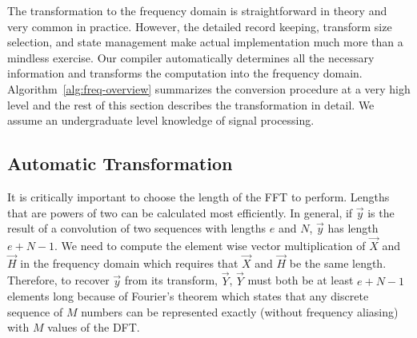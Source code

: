 The transformation to the frequency domain is straightforward in theory and 
very common in practice. However, the detailed record keeping, transform size selection,
and state management make actual implementation much more than a mindless
exercise. Our compiler automatically determines all the necessary
information and transforms the computation into the frequency domain. 
Algorithm~\ref{alg:freq-overview} summarizes the conversion procedure
at a very high level and the rest of this section describes the transformation in 
detail. We assume an undergraduate level knowledge
of signal processing.

\subsection{Automatic Transformation}
\label{sec:method-opt-freq-details}



It is critically important to choose the length of the FFT to perform. 
Lengths that are powers of two can be calculated most efficiently. 
In general, if $\vec{y}$ is the result of a convolution of 
two sequences with lengths $e$ and $N$, $\vec{y}$ has length $e+N-1$.
We need to compute the element wise vector multiplication of
$\vec{X}$ and $\vec{H}$ in the frequency domain which requires that 
$\vec{X}$ and $\vec{H}$ be the same length. Therefore, to 
recover $\vec{y}$ from its transform, $\vec{Y}$, 
$\vec{Y}$ must both be at least $e+N-1$ elements long because 
of Fourier's theorem which states that any discrete sequence of $M$ numbers 
can be represented exactly (without frequency aliasing) with 
$M$ values of the DFT. 

